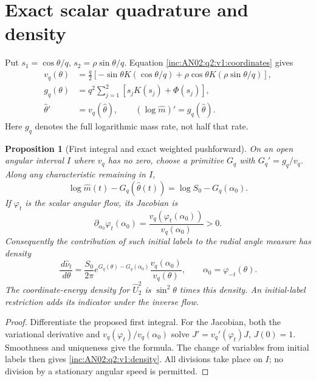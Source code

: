 \documentclass[11pt]{article}
\numberwithin{equation}{section}
\newtheorem{proposition}[theorem]{Proposition}\newtheorem{corollary}[theorem]{Corollary}
\theoremstyle{remark}\newtheorem{remark}[theorem]{Remark}
\newcommand{\dd}{\,d}\newcommand{\E}{\mathbb E}\newcommand{\R}{\mathbb R}
\begin{document}
\section{Exact scalar quadrature and density}\label{inc:AN02:q2:v1:quadrature}
Put $s_1=\cos\theta/q$, $s_2=\rho\sin\theta/q$. Equation
\eqref{inc:AN02:q2:v1:coordinates} gives
\begin{align}
 v_q(\theta)&=\frac q2\left[-\sin\theta K(\cos\theta/q)
                 +\rho\cos\theta K(\rho\sin\theta/q)\right],
 \label{inc:AN02:q2:v1:angular}\\
 g_q(\theta)&=q^2\sum_{j=1}^2[s_jK(s_j)+\Phi(s_j)],
 \label{inc:AN02:q2:v1:radial}\\
 \widehat\theta'&=v_q(\widehat\theta),\qquad
 (\log\widehat m)'=g_q(\widehat\theta).\nonumber
\end{align}
Here $g_q$ denotes the full logarithmic mass rate, not half that rate.

\begin{proposition}[First integral and exact weighted pushforward]
\label{inc:AN02:q2:v1:firstintegral}
On an open angular interval $I$ where $v_q$ has no zero, choose a primitive
$G_q$ with $G_q'=g_q/v_q$. Along any characteristic remaining in $I$,
\[
 \log\widehat m(t)-G_q(\widehat\theta(t))
                 =\log S_0-G_q(\alpha_0).
\]
If $\varphi_t$ is the scalar angular flow, its Jacobian is
\[
 \partial_{\alpha_0}\varphi_t(\alpha_0)
           =\frac{v_q(\varphi_t(\alpha_0))}{v_q(\alpha_0)}>0.
\]
Consequently the contribution of such initial labels to the radial
angle measure has density
\begin{equation}\label{inc:AN02:q2:v1:density}
 \frac{\dd\widehat\nu_t}{\dd\theta}
 =\frac{S_0}{2\pi}
 e^{G_q(\theta)-G_q(\alpha_0)}
 \frac{v_q(\alpha_0)}{v_q(\theta)},\qquad
 \alpha_0=\varphi_{-t}(\theta).
\end{equation}
The coordinate-energy density for $\widehat U_2^2$ is
$\sin^2\theta$ times this density. An initial-label restriction adds
its indicator under the inverse flow.
\end{proposition}
\begin{proof}
Differentiate the proposed first integral. For the Jacobian, both the
variational derivative and $v_q(\varphi_t)/v_q(\alpha_0)$ solve
$J'=v_q'(\varphi_t)J$, $J(0)=1$. Smoothness and uniqueness give the
formula. The change of variables from initial labels then gives
\eqref{inc:AN02:q2:v1:density}. All divisions take place on $I$;
no division by a stationary angular speed is permitted.
\end{proof}
\end{document}
